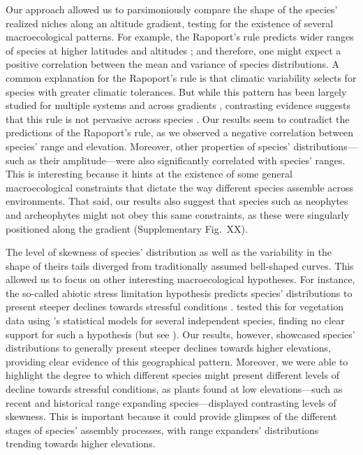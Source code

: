 \documentclass[11pt, a4paper]{article}
\begin{document}
Our approach allowed us to parsimoniously compare the shape of the species' realized niches along an altitude gradient, testing for the existence of several macroecological patterns. For example, the Rapoport's rule predicts wider ranges of species at higher latitudes and altitudes \citep{stevensElevationalGradientAltitudinal1992}; and therefore, one might expect a positive correlation between the mean and variance of species distributions. A common explanation for the Rapoport's rule is that climatic variability selects for species with greater climatic tolerances. But while this pattern has been largely studied for multiple systems and across gradients \citep{mccainElevationalRapoportRule2013}, contrasting evidence suggests that this rule is not pervasive across species \citep{ribasRapoportEffectWidespread2006, bhattaraiCanRapoportRule2006, mccainElevationalRapoportRule2013}. Our results seem to contradict the predictions of the Rapoport's rule, as we observed a negative correlation between species' range and elevation. Moreover, other properties of species' distributions---such as their amplitude---were also significantly correlated with species' ranges. This is interesting because it hints at the existence of some general macroecological constraints that dictate the way different species assemble across environments. That said, our results also suggest that species such as neophytes and archeophytes might not obey this same constraints, as these were singularly positioned along the gradient (Supplementary Fig.~XX). 

The level of skewness of species' distribution as well as the variability in the shape of theirs tails diverged from traditionally assumed bell-shaped curves. This allowed us to focus on other interesting macroecological hypotheses. For instance, the so-called abiotic stress limitation hypothesis predicts species' distributions to present steeper declines towards stressful conditions \citep{austinCommunityTheoryCompetition1990}. \citet{normandImportanceAbioticStress2009} tested this for vegetation data using \citeauthor{huismanHierarchicalSetModels1993}'s statistical models for several independent species, finding no clear support for such a hypothesis (but see \citealt{ziffer-bergerSpatialPatternsProvide2014}). Our results, however, showcased species' distributions to generally present steeper declines towards higher elevations, providing clear evidence of this geographical pattern. Moreover, we were able to highlight the degree to which different species might present different levels of decline towards stressful conditions, as plants found at low elevations---such as recent and historical range expanding species---displayed contrasting levels of skewness. This is important because it could provide glimpses of the different stages of species' assembly processes, with range expanders' distributions trending towards higher elevations. 
\end{document}
